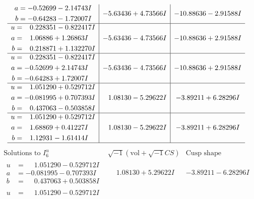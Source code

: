 \documentclass[1p]{elsarticle_modified}
\theoremstyle{definition}
\newcommand{\I}{\sqrt{-1}}
\begin{document}
$$\begin{array}{c|c|c}
\begin{aligned}
a &= -0.52699 - 2.14743 I \\
b &= -0.64283 - 1.72007 I\end{aligned}
 & -5.63436 + 4.73566 I & -10.88636 - 2.91588 I \\ \hline\begin{aligned}
u &= \phantom{-}0.228351 - 0.822417 I \\
a &= \phantom{-}1.06886 + 1.26863 I \\
b &= \phantom{-}0.218871 + 1.132270 I\end{aligned}
 & -5.63436 - 4.73566 I & -10.88636 + 2.91588 I \\ \hline\begin{aligned}
u &= \phantom{-}0.228351 - 0.822417 I \\
a &= -0.52699 + 2.14743 I \\
b &= -0.64283 + 1.72007 I\end{aligned}
 & -5.63436 - 4.73566 I & -10.88636 + 2.91588 I \\ \hline\begin{aligned}
u &= \phantom{-}1.051290 + 0.529712 I \\
a &= -0.081995 + 0.707393 I \\
b &= \phantom{-}0.437063 - 0.503858 I\end{aligned}
 & \phantom{-}1.08130 - 5.29622 I & -3.89211 + 6.28296 I \\ \hline\begin{aligned}
u &= \phantom{-}1.051290 + 0.529712 I \\
a &= \phantom{-}1.68869 + 0.41227 I \\
b &= \phantom{-}1.12931 - 1.61414 I\end{aligned}
 & \phantom{-}1.08130 - 5.29622 I & -3.89211 + 6.28296 I\\
 \hline 
 \end{array}$$\newpage$$\begin{array}{c|c|c}  
\text{Solutions to }I^u_{6}& \I (\text{vol} + \sqrt{-1}CS) & \text{Cusp shape}\\
 \hline 
\begin{aligned}
u &= \phantom{-}1.051290 - 0.529712 I \\
a &= -0.081995 - 0.707393 I \\
b &= \phantom{-}0.437063 + 0.503858 I\end{aligned}
 & \phantom{-}1.08130 + 5.29622 I & -3.89211 - 6.28296 I \\ \hline\begin{aligned}
u &= \phantom{-}1.051290 - 0.529712 I \\

\end{aligned}
\end{array}$$
\end{document}
